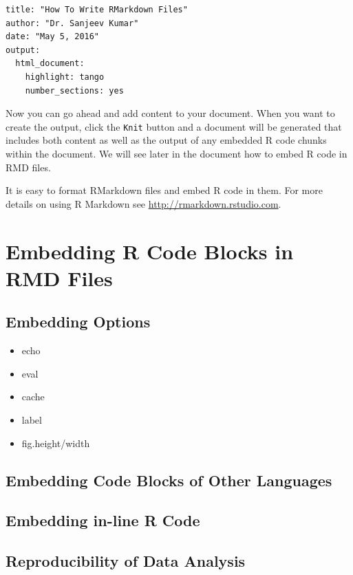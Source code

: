 \documentclass[]{krantz}
\providecommand{\tightlist}{%
  \setlength{\itemsep}{0pt}\setlength{\parskip}{0pt}}
\theoremstyle{definition}
\theoremstyle{definition}
\theoremstyle{definition}
\theoremstyle{remark}
\begin{document}
\begin{verbatim}
title: "How To Write RMarkdown Files"
author: "Dr. Sanjeev Kumar"
date: "May 5, 2016"
output:
  html_document: 
    highlight: tango
    number_sections: yes
\end{verbatim}

Now you can go ahead and add content to your document. When you want to
create the output, click the \texttt{Knit} button and a document will be
generated that includes both content as well as the output of any
embedded R code chunks within the document. We will see later in the
document how to embed R code in RMD files.

It is easy to format RMarkdown files and embed R code in them. For more
details on using R Markdown see \url{http://rmarkdown.rstudio.com}.

\section{Embedding R Code Blocks in RMD
Files}\label{embedding-r-code-blocks-in-rmd-files}

\subsection{Embedding Options}\label{embedding-options}

\begin{itemize}
\tightlist
\item
  echo
\item
  eval
\item
  cache
\item
  label
\item
  fig.height/width
\end{itemize}

\subsection{Embedding Code Blocks of Other
Languages}\label{embedding-code-blocks-of-other-languages}

\subsection{Embedding in-line R Code}\label{embedding-in-line-r-code}

\subsection{Reproducibility of Data
Analysis}\label{reproducibility-of-data-analysis}
\end{document}
